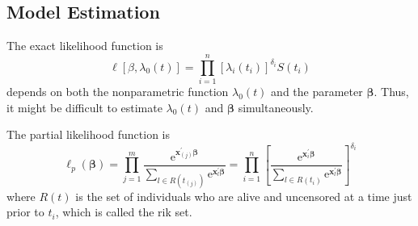 \subsection{Model Estimation}

The exact likelihood function is
\begin{equation}
    \ell\left[\beta,\lambda_{0}(t)\right]=\prod_{i=1}^{n}\left[\lambda_{i}\left(t_{i}\right)\right]^{\delta_{i}}S\left(t_{i}\right)
\end{equation}
depends on both the nonparametric function $\lambda_{0}(t)$ and the parameter $\boldsymbol{\beta}$. Thus, it might be difficult to estimate $\lambda_{0}(t)$ and $\boldsymbol{\beta}$ simultaneously.

The partial likelihood function is
\begin{equation}
    \ell_{p}(\boldsymbol{\beta})=\prod_{j=1}^{m}\frac{\mathrm{e}^{\mathbf{x}_{(j)}^{\prime}\boldsymbol{\beta}}}{\sum_{l\in R\left(t_{(j)}\right)}\mathrm{e}^{\mathbf{x}_{l}^{\prime}\boldsymbol{\beta}}}=\prod_{i=1}^{n}\left[\frac{\mathrm{e}^{\mathbf{x}_{i}^{\prime}\boldsymbol{\beta}}}{\sum_{l\in R\left(t_{i}\right)}\mathrm{e}^{\mathbf{x}_{l}^{\prime}\boldsymbol{\beta}}}\right]^{\delta_{i}}
\end{equation}
where $R(t)$ is the set of individuals who are alive and uncensored at a time just prior to $t_{i}$, which is called the rik set.
